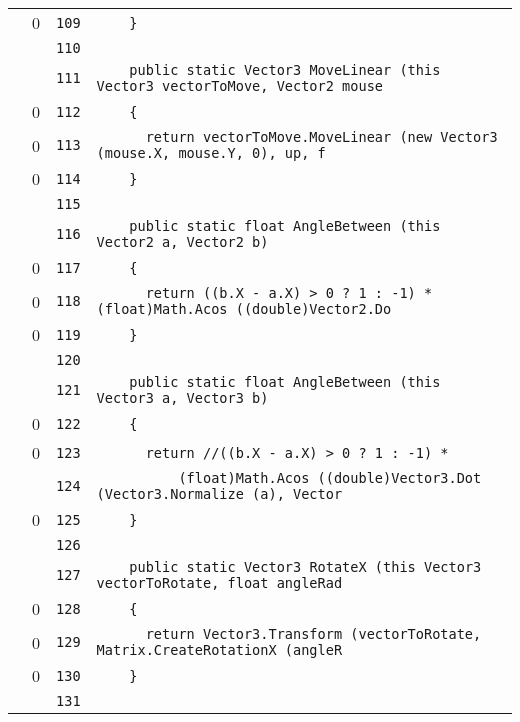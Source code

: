\documentclass[a4paper,10pt]{article}
\begin{document}
\begin{longtable}[l]{lrrl}
\cellcolor{red} & 0 & \verb~109~ & \verb~    }~\\
\cellcolor{gray} &  & \verb~110~ & \verb~~\\
\cellcolor{gray} &  & \verb~111~ & \verb~    public static Vector3 MoveLinear (this Vector3 vectorToMove, Vector2 mouse~\\
\cellcolor{red} & 0 & \verb~112~ & \verb~    {~\\
\cellcolor{red} & 0 & \verb~113~ & \verb~      return vectorToMove.MoveLinear (new Vector3 (mouse.X, mouse.Y, 0), up, f~\\
\cellcolor{red} & 0 & \verb~114~ & \verb~    }~\\
\cellcolor{gray} &  & \verb~115~ & \verb~~\\
\cellcolor{gray} &  & \verb~116~ & \verb~    public static float AngleBetween (this Vector2 a, Vector2 b)~\\
\cellcolor{red} & 0 & \verb~117~ & \verb~    {~\\
\cellcolor{red} & 0 & \verb~118~ & \verb~      return ((b.X - a.X) > 0 ? 1 : -1) * (float)Math.Acos ((double)Vector2.Do~\\
\cellcolor{red} & 0 & \verb~119~ & \verb~    }~\\
\cellcolor{gray} &  & \verb~120~ & \verb~~\\
\cellcolor{gray} &  & \verb~121~ & \verb~    public static float AngleBetween (this Vector3 a, Vector3 b)~\\
\cellcolor{red} & 0 & \verb~122~ & \verb~    {~\\
\cellcolor{red} & 0 & \verb~123~ & \verb~      return //((b.X - a.X) > 0 ? 1 : -1) *~\\
\cellcolor{gray} &  & \verb~124~ & \verb~          (float)Math.Acos ((double)Vector3.Dot (Vector3.Normalize (a), Vector~\\
\cellcolor{red} & 0 & \verb~125~ & \verb~    }~\\
\cellcolor{gray} &  & \verb~126~ & \verb~~\\
\cellcolor{gray} &  & \verb~127~ & \verb~    public static Vector3 RotateX (this Vector3 vectorToRotate, float angleRad~\\
\cellcolor{red} & 0 & \verb~128~ & \verb~    {~\\
\cellcolor{red} & 0 & \verb~129~ & \verb~      return Vector3.Transform (vectorToRotate, Matrix.CreateRotationX (angleR~\\
\cellcolor{red} & 0 & \verb~130~ & \verb~    }~\\
\cellcolor{gray} &  & \verb~131~ & \verb~~\\

\end{longtable}
\end{document}

